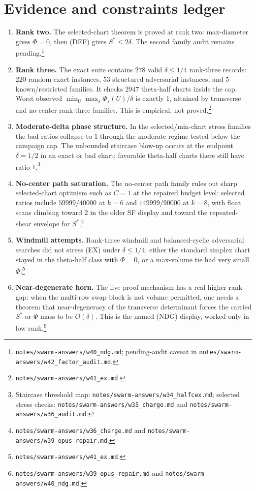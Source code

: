 \documentclass[11pt]{article}
\theoremstyle{plain}
\theoremstyle{definition}
\theoremstyle{remark}
\begin{document}
\section{Evidence and constraints ledger}

\begin{enumerate}
\item \textbf{Rank two.}  The selected-chart theorem is proved at rank two:
max-diameter gives $\Phi=0$, then (DEF) gives $S^*\le2\delta$.  The second
family audit remains pending.\footnote{\texttt{notes/swarm-answers/w40\_ndg.md};
pending-audit caveat in
\texttt{notes/swarm-answers/w42\_factor\_audit.md}.}

\item \textbf{Rank three.}  The exact suite contains $278$ valid
$\delta\le1/4$ rank-three records: $220$ random exact instances, $53$
structured adversarial instances, and $5$ known/restricted families.  It checks
$2947$ theta-half charts inside the cap.  Worst observed
$\min_U\max_s\Phi_s(U)/\delta$ is exactly $1$, attained by transverse and
no-center rank-three families.  This is empirical, not proved.\footnote{
\texttt{notes/swarm-answers/w41\_ex.md}.}

\item \textbf{Moderate-delta phase structure.}  In the selected/min-chart
stress families the bad ratios collapse to $1$ through the moderate regime
tested below the campaign cap.  The unbounded staircase blow-up occurs at the
endpoint $\delta=1/2$ in an exact or bad chart; favorable theta-half charts
there still have ratio $1$.\footnote{Staircase threshold map:
\texttt{notes/swarm-answers/w34\_halfcex.md}; selected stress checks:
\texttt{notes/swarm-answers/w35\_charge.md} and
\texttt{notes/swarm-answers/w36\_audit.md}.}

\item \textbf{No-center path saturation.}  The no-center path family rules out
sharp selected-chart optimism such as $C=1$ at the repaired budget level:
selected ratios include $59999/40000$ at $k=6$ and $149999/90000$ at $k=8$,
with float scans climbing toward $2$ in the older SF display and toward the
repeated-shear envelope for $S^*$.\footnote{
\texttt{notes/swarm-answers/w36\_charge.md} and
\texttt{notes/swarm-answers/w39\_opus\_repair.md}.}

\item \textbf{Windmill attempts.}  Rank-three windmill and balanced-cyclic
adversarial searches did not stress \textup{(EX)} under $\delta\le1/4$: either
the standard simplex chart stayed in the theta-half class with $\Phi=0$, or a
max-volume tie had very small $\Phi$.\footnote{
\texttt{notes/swarm-answers/w41\_ex.md}.}

\item \textbf{Near-degenerate horn.}  The live proof mechanism has a real
higher-rank gap: when the multi-row swap block is not volume-permitted, one
needs a theorem that near-degeneracy of the transverse determinant forces the
carried $S^*$ or $\Phi$ mass to be $O(\delta)$.  This is the named (NDG)
display, worked only in low rank.\footnote{
\texttt{notes/swarm-answers/w39\_opus\_repair.md} and
\texttt{notes/swarm-answers/w40\_ndg.md}.}
\end{enumerate}
\end{document}
